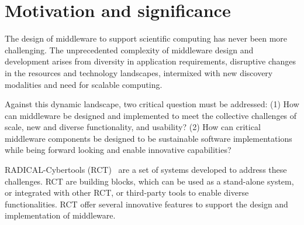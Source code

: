 \documentclass[preprint,12pt, a4paper]{elsarticle}
\begin{document}
\section{Motivation and significance}\label{sec:motivation}


The design of middleware to support scientific computing has never been more
challenging. The unprecedented complexity of middleware design and development
arises from diversity in application requirements, disruptive changes in the
resources and technology landscapes, intermixed with new discovery modalities
and need for scalable computing.

Against this dynamic landscape, two critical question must be addressed: (1) How
can middleware be designed and implemented to meet the collective challenges of
scale, new and diverse functionality, and usability? (2) How can critical
middleware components be designed to be sustainable software implementations
while being forward looking and enable innovative capabilities?

RADICAL-Cybertools (RCT)~\cite{github-rct} are a set of systems developed to
address these challenges.  RCT are building blocks, which can be used as a
stand-alone system, or integrated with other RCT, or third-party tools to enable
diverse functionalities. RCT offer several innovative features to support the
design and implementation of middleware.
\end{document}
